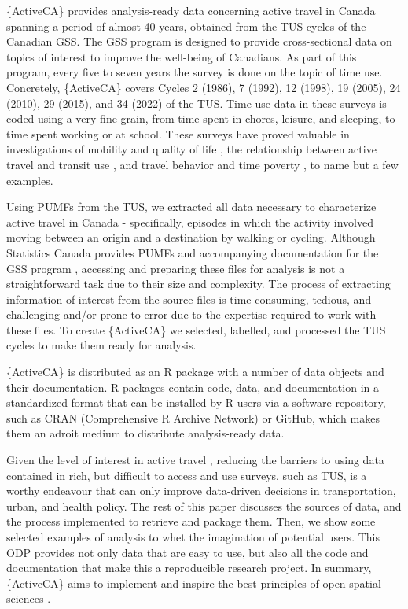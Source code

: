 \documentclass[Royal,times,sageh]{sagej}
\begin{document}
\{ActiveCA\} provides analysis-ready data concerning active travel in
Canada spanning a period of almost 40 years, obtained from the TUS
cycles of the Canadian GSS. The GSS program is designed to provide
cross-sectional data on topics of interest to improve the well-being of
Canadians. As part of this program, every five to seven years the survey
is done on the topic of time use. Concretely, \{ActiveCA\} covers Cycles
2 (1986), 7 (1992), 12 (1998), 19 (2005), 24 (2010), 29 (2015), and 34
(2022) of the TUS. Time use data in these surveys is coded using a very
fine grain, from time spent in chores, leisure, and sleeping, to time
spent working or at school. These surveys have proved valuable in
investigations of mobility and quality of life
\citep{spinneyTransport2009}, the relationship between active travel and
transit use \citep{lachapelleLonger2016}, and travel behavior and time
poverty \citep{kimFacing2024}, to name but a few examples.

Using PUMFs from the TUS, we extracted all data necessary to
characterize active travel in Canada - specifically, episodes in which
the activity involved moving between an origin and a destination by
walking or cycling. Although Statistics Canada provides PUMFs and
accompanying documentation for the GSS program
\citep[see][]{statisticscanada2024}, accessing and preparing these files
for analysis is not a straightforward task due to their size and
complexity. The process of extracting information of interest from the
source files is time-consuming, tedious, and challenging and/or prone to
error due to the expertise required to work with these files. To create
\{ActiveCA\} we selected, labelled, and processed the TUS cycles to make
them ready for analysis.

\{ActiveCA\} is distributed as an R package with a number of data
objects and their documentation. R packages contain code, data, and
documentation in a standardized format that can be installed by R users
via a software repository, such as CRAN (Comprehensive R Archive
Network) or GitHub, which makes them an adroit medium to distribute
analysis-ready data.

Given the level of interest in active travel
\citep[e.g.,][]{mccurdySupport2023}, reducing the barriers to using data
contained in rich, but difficult to access and use surveys, such as TUS,
is a worthy endeavour that can only improve data-driven decisions in
transportation, urban, and health policy. The rest of this paper
discusses the sources of data, and the process implemented to retrieve
and package them. Then, we show some selected examples of analysis to
whet the imagination of potential users. This ODP provides not only data
that are easy to use, but also all the code and documentation that make
this a reproducible research project. In summary, \{ActiveCA\} aims to
implement and inspire the best principles of open spatial sciences
\citep{paez_open_2021, brunsdon_opening_2021}.
\end{document}
